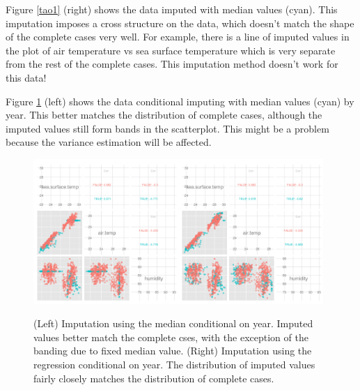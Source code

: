 \documentclass[article]{jss}
\begin{document}
Figure \ref{tao1} (right) shows the data imputed with median values (cyan). This imputation imposes a cross structure on the data, which doesn't match the shape of the complete cases very well. For example, there is a line of imputed values in the plot of air temperature vs sea surface temperature which is very separate from the rest of the complete cases. This imputation method doesn't work for this data!


Figure \ref{tao3} (left) shows the data conditional imputing with median values (cyan) by year. This better matches the distribution of complete cases, although the imputed values still form bands in the scatterplot. This might be a problem because the variance estimation will be affected. 


\begin{figure}[htp]
\centerline{\includegraphics[width=0.49\textwidth]{tao3_pairwise.png}\includegraphics[width=0.49\textwidth]{tao5_pairwise.png}}
\caption{(Left) Imputation using the median conditional on year. Imputed values better match the complete cses, with the exception of the banding due to fixed median value. (Right) Imputation using the regression conditional on year. The distribution of imputed values fairly closely matches the distribution of complete cases.}
\label{tao3}
\end{figure}
\end{document}
